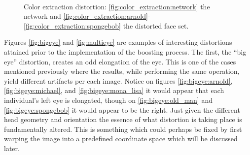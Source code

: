 \begin{figure}
{    }
     \\
    \caption{Color extraction distortion: \ref{fig:color_extraction:network} the network and \ref{fig:color_extraction:arnold}-\ref{fig:color_extraction:spongebob} the distorted face set.\label{fig:color_extraction}}
\end{figure}

Figures \ref{fig:bigeye} and \ref{fig:multieye} are examples of interesting distortions attained prior to the implementation of the boosting process. The first, the ``big eye'' distortion, creates an odd elongation of the eye. This is one of the cases mentioned previously where the results, while performing the same operation, yield different artifacts per each image. Notice on figures \ref{fig:bigeye:arnold}, \ref{fig:bigeye:michael}, and \ref{fig:bigeye:mona_lisa} it would appear that each individual's left eye is elongated, though on \ref{fig:bigeye:old_man} and \ref{fig:bigeye:spongebob} it would appear to be the right. Just given the different head geometry and orientation the essence of what distortion is taking place is fundamentally altered. This is something which could perhaps be fixed by first warping the image into a predefined coordinate space which will be discussed later.

